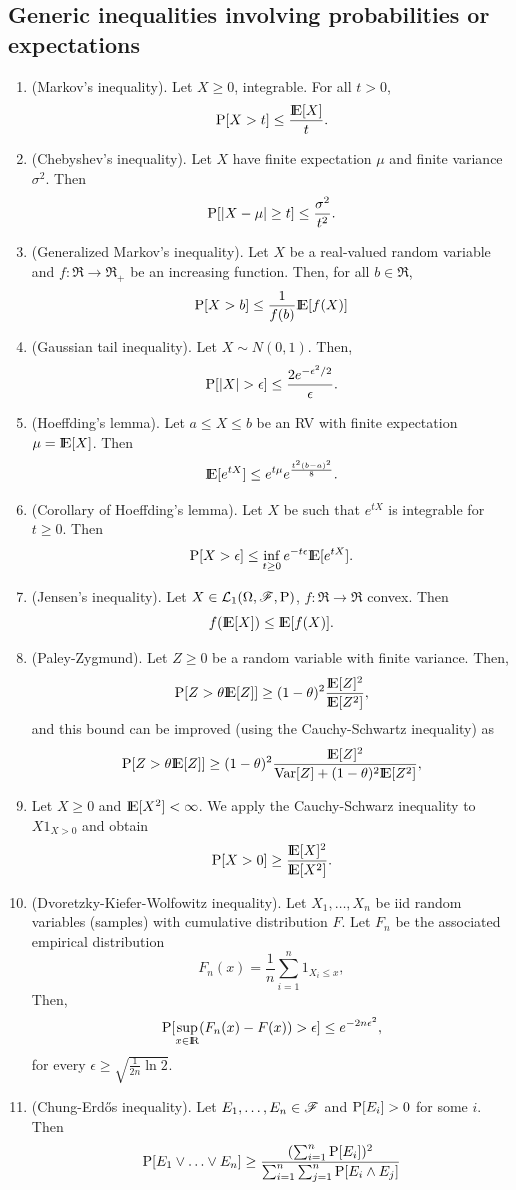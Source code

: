 \documentclass[a4paper,10pt]{article}
\begin{document}
\subsection{Generic inequalities involving probabilities or expectations}
\begin{enumerate}
  \item (Markov's inequality). Let $X\geq 0$, integrable. For all $t>0$, 
 \[ 
 \prob[X>t]\leq \frac{\E[X]}{t}.
 \]
 \item (Chebyshev's inequality). Let $X$ have finite expectation $\mu$ and finite variance $\sigma^2$. Then
 \[
  \mathrm{P}[|X-\mu|\geq t] \leq \frac{\sigma^2}{t^2}.
 \]
 \item (Generalized Markov's inequality). Let $X$ be a real-valued random variable and $f:\Re\to\Re_+$
       be an increasing function. Then, for all $b\in\Re$,
       \[
        \prob[X>b]\leq \frac{1}{f(b)}\E[f(X)]
       \]
  \item (Gaussian tail inequality). Let $X\sim N(0,1)$. Then,
 \[ 
  \prob[|X|>\epsilon] \leq \frac{2e^{-\epsilon^2/2}}{\epsilon}.
 \]       
 \item (Hoeffding's lemma). Let $a\leq X\leq b$ be an RV with finite expectation $\mu=\E[X]$.
 Then
 \[
  \E[e^{tX}] \leq e^{t\mu}e^{\frac{t^2(b-a)^2}{8}}.
 \]
\item (Corollary of Hoeffding's lemma). Let $X$ be such that $e^{tX}$ is integrable for $t\geq 0$. Then
\[
 \prob[X>\epsilon]\leq \inf_{t\geq 0}e^{-t\epsilon}\E[e^{tX}].
\]
 \item (Jensen's inequality). Let $X\in\mathcal{L}_1(\Omega,\mathscr{F},\mathrm{P})$, $f:\Re\to\Re$ convex. Then
   \[
     f(\E[X])\leq \E[f(X)].
    \]
\item (Paley-Zygmund). Let $Z\geq 0$ be a random variable with finite variance. Then,
      \[
       \prob[Z > \theta \E[Z]] \geq (1-\theta)^2\frac{\E[Z]^2}{\E[Z^2]},
      \]
     and this bound can be improved (using the Cauchy-Schwartz inequality) as
     \[
       \prob[Z > \theta \E[Z]] \geq (1-\theta)^2\frac{\E[Z]^2}{\mathrm{Var}[Z]+(1-\theta)^2\E[Z^2]},
      \]
\item Let $X\geq 0$ and $\E[X^2]<\infty$. We apply the Cauchy-Schwarz inequality to $X1_{X>0}$ and obtain
      \[
       \prob[X>0] \geq \frac{\E[X]^2}{\E[X^2]}.
      \]



\item (Dvoretzky-Kiefer-Wolfowitz inequality). Let $X_1,\ldots, X_n$ be iid random variables (samples)
      with cumulative distribution $F$. Let $F_n$ be the associated empirical distribution
      \[
       F_n(x) = \frac{1}{n}\sum_{i=1}^n 1_{X_i\leq x},
      \]
      Then,
      \[
       \prob[\sup_{x\in\Re}(F_n(x) - F(x)) > \epsilon] \leq e^{-2n\epsilon^2},
      \]
      for every $\epsilon \geq \sqrt{\tfrac{1}{2n}\ln 2}$.
\item (Chung-Erd\H{o}s inequality). Let $E_1,\ldots, E_n\in\mathscr{F}$ and $\mathrm{P}[E_i]>0$ for some $i$. Then 
      \[
       \mathrm{P}[E_1 \vee \ldots \vee E_n] \geq \frac{(\sum_{i=1}^{n}\mathrm{P}[E_i])^2}{\sum_{i=1}^{n}\sum_{j=1}^{n}\mathrm{P}[E_i\wedge E_j]}
      \]

\end{enumerate}
\end{document}
